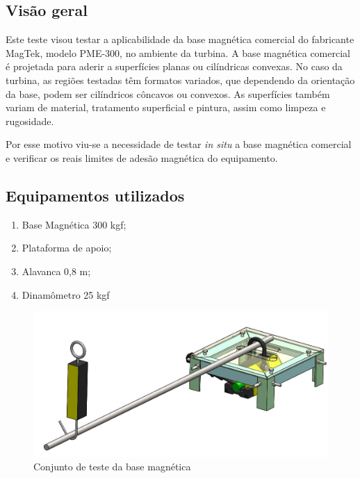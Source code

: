 \subsection{Visão geral}
Este teste visou testar a aplicabilidade da base magnética comercial do
fabricante MagTek, modelo PME-300, no ambiente da turbina. A base magnética
comercial é projetada para aderir a superfícies planas ou cilíndricas convexas.
No caso da turbina, as regiões testadas têm formatos variados, que dependendo da
orientação da base, podem ser cilíndricos côncavos ou convexos. As
superfícies também variam de material, tratamento superficial e pintura,
assim como limpeza e rugosidade.

Por esse motivo viu-se a necessidade de testar
\textit{in situ} a base magnética comercial e verificar os reais limites de
adesão magnética do equipamento.


\subsection{Equipamentos utilizados}
\begin{enumerate}
  \item Base Magnética 300 kgf;
  \item Plataforma de apoio;
  \item Alavanca 0,8 m;
  \item Dinamômetro 25 kgf
\end{enumerate} 

\begin{figure}[h!]
\centering
	\includegraphics[width=0.9\columnwidth]{figs/base/conjunto_01}
	\caption{Conjunto de teste da base magnética}
	\label{fig::conjunto}
\end{figure}

\newpage
